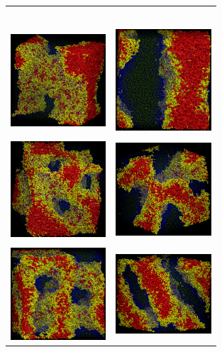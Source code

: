\documentclass[
aip,
jcp,
reprint,
]{revtex4-1}
\begin{document}
\begin{figure}
	\centering
	\begin{tabular}{C{1.6in}@{}C{1.6in}}
		  \textcolor{white}{} & \textcolor{white}{Flory-type} \\
		  \\
		 \includegraphics[width=1.4in]{A5B5_030} & \includegraphics[width=1.4in]{A5B5_Flory_030} \\
		  \\
		 \includegraphics[width=1.4in]{A5B5_050} & \includegraphics[width=1.4in]{A5B5_Flory_050} \\
    	  \\ \includegraphics[width=1.4in]{A5B5_055} & \includegraphics[width=1.4in]{A5B5_Flory_055} \\

\end{tabular}
\end{figure}
\end{document}

